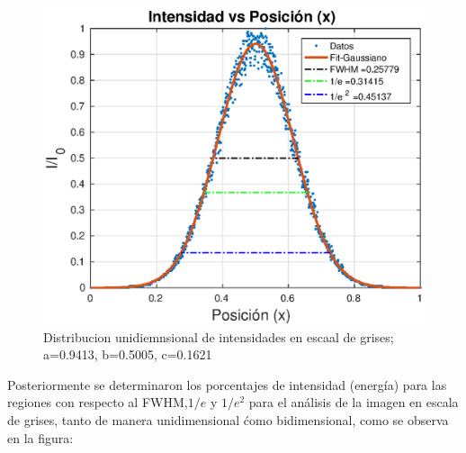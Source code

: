 \documentclass[11pt,letterpaper,twocolumn]{article}
\begin{document}
\begin{figure}[h!]
\begin{center}
\includegraphics[scale=0.6]{dis-1d-gris.eps}
\caption{Distribucion unidiemnsional de intensidades en escaal de grises; a=0.9413, b=0.5005, c=0.1621}
\end{center}
\label{dis-1D-gris}
\end{figure}
\par 
Posteriormente se determinaron los porcentajes de intensidad (energía) para las regiones con respecto al FWHM,$1/e$ y $1/e^{2}$ para el análisis de la imagen en escala de grises, tanto de manera unidimensional ćomo bidimensional, como se observa en la figura:\\ 
\end{document}
